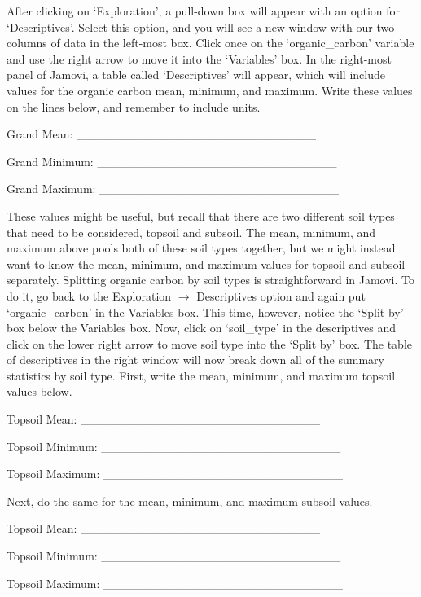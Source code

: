 \documentclass[
]{scrbook}
\begin{document}
After clicking on `Exploration', a pull-down box will appear with an option for `Descriptives'.
Select this option, and you will see a new window with our two columns of data in the left-most box.
Click once on the `organic\_carbon' variable and use the right arrow to move it into the `Variables' box.
In the right-most panel of Jamovi, a table called `Descriptives' will appear, which will include values for the organic carbon mean, minimum, and maximum.
Write these values on the lines below, and remember to include units.

Grand Mean: \_\_\_\_\_\_\_\_\_\_\_\_\_\_\_\_\_\_\_\_\_\_\_\_\_\_\_\_

Grand Minimum: \_\_\_\_\_\_\_\_\_\_\_\_\_\_\_\_\_\_\_\_\_\_\_\_\_\_\_\_

Grand Maximum: \_\_\_\_\_\_\_\_\_\_\_\_\_\_\_\_\_\_\_\_\_\_\_\_\_\_\_\_

These values might be useful, but recall that there are two different soil types that need to be considered, topsoil and subsoil.
The mean, minimum, and maximum above pools both of these soil types together, but we might instead want to know the mean, minimum, and maximum values for topsoil and subsoil separately.
Splitting organic carbon by soil types is straightforward in Jamovi.
To do it, go back to the Exploration \(\to\) Descriptives option and again put `organic\_carbon' in the Variables box.
This time, however, notice the `Split by' box below the Variables box.
Now, click on `soil\_type' in the descriptives and click on the lower right arrow to move soil type into the `Split by' box.
The table of descriptives in the right window will now break down all of the summary statistics by soil type.
First, write the mean, minimum, and maximum topsoil values below.

Topsoil Mean: \_\_\_\_\_\_\_\_\_\_\_\_\_\_\_\_\_\_\_\_\_\_\_\_\_\_\_\_

Topsoil Minimum: \_\_\_\_\_\_\_\_\_\_\_\_\_\_\_\_\_\_\_\_\_\_\_\_\_\_\_\_

Topsoil Maximum: \_\_\_\_\_\_\_\_\_\_\_\_\_\_\_\_\_\_\_\_\_\_\_\_\_\_\_\_

Next, do the same for the mean, minimum, and maximum subsoil values.

Topsoil Mean: \_\_\_\_\_\_\_\_\_\_\_\_\_\_\_\_\_\_\_\_\_\_\_\_\_\_\_\_

Topsoil Minimum: \_\_\_\_\_\_\_\_\_\_\_\_\_\_\_\_\_\_\_\_\_\_\_\_\_\_\_\_

Topsoil Maximum: \_\_\_\_\_\_\_\_\_\_\_\_\_\_\_\_\_\_\_\_\_\_\_\_\_\_\_\_
\end{document}
